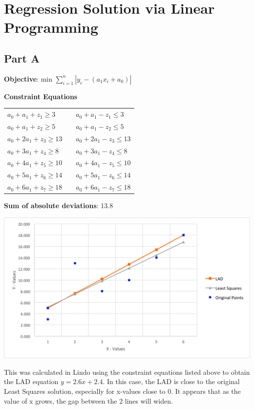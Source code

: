 \documentclass[11pt,letterpaper]{article}
\begin{document}
\section{Regression Solution via Linear Programming}
\subsection*{Part A}
\textbf{Objective}: min $\sum\limits_{i=1}^n |y_i -  (a_1x_i + a_0)|$\vspace{8pt}

\textbf{Constraint Equations}

\begin{tabular}{l l l}
$a_0+a_1+z_1\geq3$	&  & $a_0+a_1-z_1\leq3$\\
$a_0+a_1+z_2\geq5$ 	& & $a_0+a_1-z_2\leq5$\\
$a_0+2a_1+z_3\geq13$	& & $a_0+2a_1-z_3\leq13$\\
$a_0+3a_1+z_4\geq8$	& & $a_0+3a_1-z_4\leq8$\\
$a_0+4a_1+z_5\geq10$	& & $a_0+4a_1-z_5\leq10$\\
$a_0+5a_1+z_6\geq14$	& & $a_0+5a_1-z_6\leq14$\\
$a_0+6a_1+z_7\geq18$	& & $a_0+6a_1-z_7\leq18$\\
\end{tabular}\vspace{8pt}


\textbf{Sum of absolute deviations}: 13.8\vspace{8pt}


\centerline{\includegraphics[width=7in]{lad.png}}\vspace{8pt}

This was calculated in Lindo using the constraint equations listed above to obtain the LAD equation $y = 2.6x + 2.4$. In this case, the LAD is close to the original Least Squares solution, especially for x-values close to 0. It appears that as the value of x grows, the gap between the 2 lines will widen.\vspace{8pt}
\end{document}
